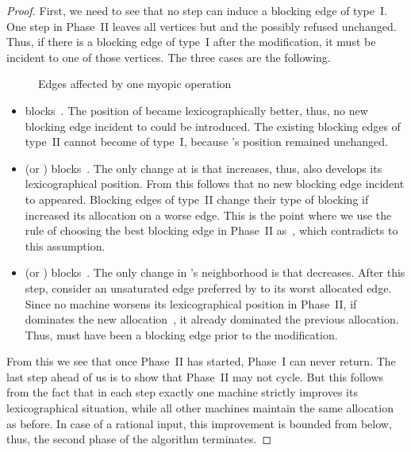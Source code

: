 \documentclass{llncs}
\begin{document}
\begin{proof}
First, we need to see that no step can induce a blocking edge of type~I. One step in Phase~II leaves all vertices but  and the possibly refused  unchanged. Thus, if there is a blocking edge of type~I after the modification, it must be incident to one of those vertices. The three cases are the following.
\begin{figure}[H]
\begin{center}
\end{center}
\caption{Edges affected by one myopic operation}
\end{figure}

\begin{itemize}
	\item  blocks~. The position of  became lexicographically better, thus, no new blocking edge incident to  could be introduced. The existing blocking edges  of type~II cannot become of type~I, because 's position remained unchanged.
	\item  (or ) blocks~. The only change at  is that  increases, thus,  also develops its  lexicographical position. From this follows that no new blocking edge incident to  appeared. Blocking edges of type~II change their type of blocking if  increased its allocation on a worse edge. This is the point where we use the rule of choosing the best blocking edge in Phase~II as~, which contradicts to this assumption.
	\item  (or ) blocks~. The only change in 's neighborhood is that  decreases. After this step, consider an unsaturated edge  preferred by  to its worst allocated edge. Since no machine worsens its lexicographical position in Phase~II, if  dominates the new allocation~, it already dominated the previous allocation. Thus,  must have been a blocking edge prior to the modification.  
\end{itemize}

From this we see that once Phase~II has started, Phase~I can never return. The last step ahead of us is to show that Phase~II may not cycle. But this follows from the fact that in each step exactly one machine strictly improves its lexicographical situation, while all other machines maintain the same allocation as before. In case of a rational input, this improvement is bounded from below, thus, the second phase of the algorithm terminates.


\end{proof}
\end{document}
